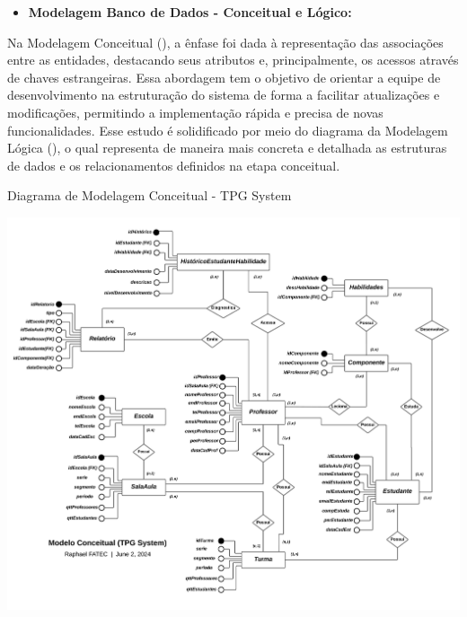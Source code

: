 \begin{itemize}

\item \textbf{Modelagem Banco de Dados - Conceitual e Lógico:}
\\

\end{itemize}

Na Modelagem Conceitual (), a ênfase foi dada à representação das associações entre as entidades, destacando seus atributos e, principalmente, os acessos através de chaves estrangeiras. Essa abordagem tem o objetivo de orientar a equipe de desenvolvimento na estruturação do sistema de forma a facilitar atualizações e modificações, permitindo a implementação rápida e precisa de novas funcionalidades. Esse estudo é solidificado por meio do diagrama da Modelagem Lógica (), o qual representa de maneira mais concreta e detalhada as estruturas de dados e os relacionamentos definidos na etapa conceitual.
\\

\begin{flowchart}[!h]
\centering
\caption{Diagrama de Modelagem Conceitual - TPG System}%
\label{fcht:imgdgMC.jpg}
\includegraphics[scale=0.34]{Illustrations/imgdgMC.jpg}
\end{flowchart}
\\
\pagebreak

